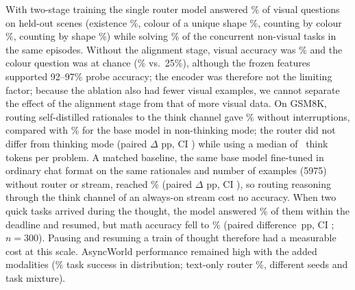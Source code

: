 \documentclass[10pt]{article}
\providecommand{\gsmthinkclause}{}
\begin{document}
With two-stage training the single router model answered \visall\% of visual questions on held-out scenes (existence \visexists\%, colour of a unique shape \viscolorof\%, counting by colour \viscountcolor\%, counting by shape \viscountshape\%) while solving \visother\% of the concurrent non-visual tasks in the same episodes. Without the alignment stage, visual accuracy was \visallnoalign\% and the colour question was at chance (\viscolorofnoalign\% vs.\ 25\%), although the frozen features supported 92--97\% probe accuracy; the encoder was therefore not the limiting factor; because the ablation also had fewer visual examples, we cannot separate the effect of the alignment stage from that of more visual data. On GSM8K, routing self-distilled rationales to the think channel gave \gsmsolo\% without interruptions, compared with \gsmbase\% for the base model in non-thinking mode\gsmthinkclause; the router did not differ from thinking mode (paired $\Delta$\,\gsmvsthink\,pp, CI \gsmvsthinkci) while using a median of \gsmthinktok\ think tokens per problem. A matched baseline, the same base model fine-tuned in ordinary chat format on the same rationales and number of examples (5975) without router or stream, reached \gsmsft\% (paired $\Delta$\,\gsmvssft\,pp, CI \gsmvssftci), so routing reasoning through the think channel of an always-on stream cost no accuracy. When two quick tasks arrived during the thought, the model answered \gsmasyncquick\% of them within the deadline and resumed, but math accuracy fell to \gsmasync\% (paired difference \gsmdiff\,pp, CI \gsmdiffci; $n=300$). Pausing and resuming a train of thought therefore had a measurable cost at this scale. AsyncWorld performance remained high with the added modalities (\mmidtask\% task success in distribution; text-only router \routeridtask\%, different seeds and task mixture).
\end{document}
